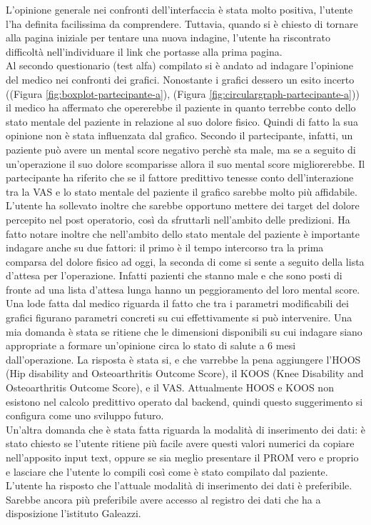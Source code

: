 L'opinione generale nei confronti dell'interfaccia è stata molto positiva, l'utente l'ha definita facilissima da comprendere. Tuttavia, quando si è chiesto di tornare alla pagina iniziale per tentare una nuova indagine, l'utente ha riscontrato difficoltà nell'individuare il link che portasse alla prima pagina. \\
Al secondo questionario (test alfa) compilato si è andato ad indagare l'opinione del medico nei confronti dei grafici. Nonostante i grafici dessero un esito incerto ((Figura \ref{fig:boxplot-partecipante-a}), (Figura \ref{fig:circulargraph-partecipante-a})) il medico ha affermato che opererebbe il paziente in quanto terrebbe conto dello stato mentale del paziente in relazione al suo dolore fisico. Quindi di fatto la sua opinione non è stata influenzata dal grafico. Secondo il partecipante, infatti, un paziente può avere un mental score negativo perchè sta male, ma se a seguito di un'operazione il suo dolore scomparisse allora il suo mental score migliorerebbe. Il partecipante ha riferito che se il fattore predittivo tenesse conto dell'interazione tra la VAS e lo stato mentale del paziente il grafico sarebbe molto più affidabile.\\
L'utente ha sollevato inoltre che sarebbe opportuno mettere dei target del dolore percepito nel post operatorio, così da sfruttarli nell'ambito delle predizioni. Ha fatto notare inoltre che nell'ambito dello stato mentale del paziente è importante indagare anche su due fattori: il primo è il tempo intercorso tra la prima comparsa del dolore fisico ad oggi, la seconda di come si sente a seguito della lista d'attesa per l'operazione. Infatti pazienti che stanno male e che sono posti di fronte ad una lista d'attesa lunga hanno un peggioramento del loro mental score. \\
Una lode fatta dal medico riguarda il fatto che tra i parametri modificabili dei grafici figurano parametri concreti su cui effettivamente si può intervenire. Una mia domanda è stata se ritiene che le dimensioni disponibili su cui indagare siano appropriate a formare un'opinione circa lo stato di salute a 6 mesi dall'operazione. La risposta è stata si, e che varrebbe la pena aggiungere l'HOOS (Hip disability and Osteoarthritis Outcome Score), il KOOS (Knee Disability and Osteoarthritis Outcome Score), e il VAS. Attualmente HOOS e KOOS non esistono nel calcolo predittivo operato dal backend, quindi questo suggerimento si configura come uno sviluppo futuro. \\
Un'altra domanda che è stata fatta riguarda la modalità di inserimento dei dati: è stato chiesto se l'utente ritiene più facile avere questi valori numerici da copiare nell'apposito input text, oppure se sia meglio presentare il PROM vero e proprio e lasciare che l'utente lo compili così come è stato compilato dal paziente. L'utente ha risposto che l'attuale modalità di inserimento dei dati è preferibile. Sarebbe ancora più preferibile avere accesso al registro dei dati che ha a disposizione l'istituto Galeazzi. 


